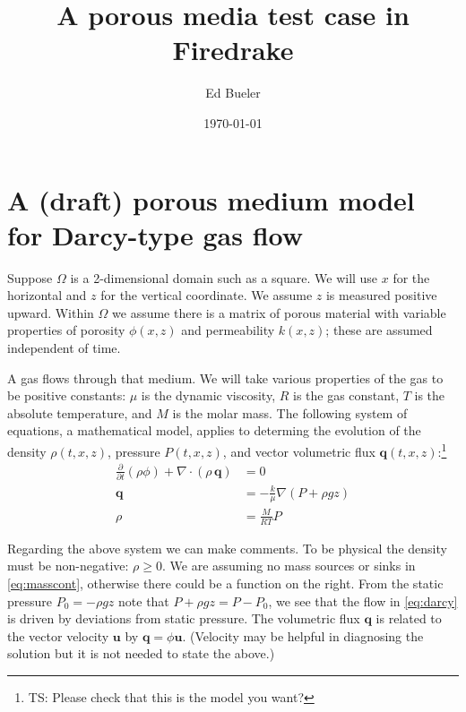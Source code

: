 \documentclass[11pt]{article}
\title{A porous media test case in Firedrake}
\author{Ed Bueler}
\date{\today}
\newcommand{\bq}{\mathbf{q}}
\newcommand{\bu}{\mathbf{u}}
\newcommand{\Div}{\nabla\cdot}
\newcommand{\grad}{\nabla}
\begin{document}
\maketitle

\thispagestyle{empty}

\section{A (draft) porous medium model for Darcy-type gas flow}

Suppose $\Omega$ is a 2-dimensional domain such as a square.  We will use $x$ for the horizontal and $z$ for the vertical coordinate.  We assume $z$ is measured positive upward.  Within $\Omega$ we assume there is a matrix of porous material with variable properties of porosity $\phi(x,z)$ and permeability $k(x,z)$; these are assumed independent of time.

A gas flows through that medium.  We will take various properties of the gas to be positive constants: $\mu$ is the dynamic viscosity, $R$ is the gas constant, $T$ is the absolute temperature, and $M$ is the molar mass.  The following system of equations, a mathematical model, applies to determing the evolution of the density $\rho(t,x,z)$, pressure $P(t,x,z)$, and vector volumetric flux $\bq(t,x,z)$:\footnote{TS: Please check that this is the model you want?}
\begin{subequations}
\label{eq:pmtime:early}
\begin{align}
\frac{\partial}{\partial t} \left(\rho \phi\right) + \Div \left(\rho\, \bq\right) &= 0 \label{eq:masscont} \\
\bq &= - \frac{k}{\mu} \grad\left(P + \rho g z\right) \label{eq:darcy} \\
\rho &= \frac{M}{RT} P \label{eq:idealgas}
\end{align}
\end{subequations}

Regarding the above system we can make comments.  To be physical the density must be non-negative: $\rho\ge 0$.  We are assuming no mass sources or sinks in \eqref{eq:masscont}, otherwise there could be a function on the right.  From the static pressure $P_0=-\rho g z$ note that $P+\rho g z = P-P_0$, we see that the flow in \eqref{eq:darcy} is driven by deviations from static pressure.  The volumetric flux $\bq$ is related to the vector velocity $\bu$ by $\bq = \phi \bu$.  (Velocity may be helpful in diagnosing the solution but it is not needed to state the above.)
\end{document}

